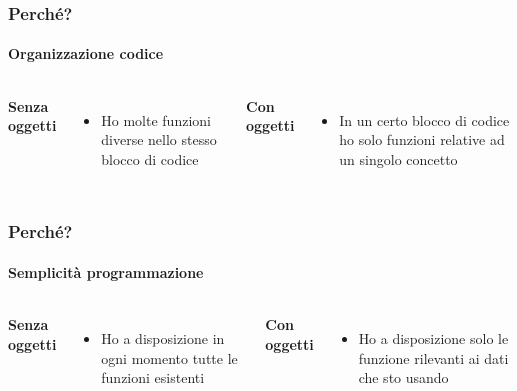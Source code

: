 \begin{contentframe}
    \frametitle{Perché?}
    \framesubtitle{Organizzazione codice}

    \begin{columns}
        \textbf{Senza oggetti}
        \begin{itemize}
            \item Ho molte funzioni diverse nello stesso blocco di codice
        \end{itemize}
        
        \textbf{Con oggetti}
        \begin{itemize}
            \item In un certo blocco di codice ho solo funzioni relative ad un singolo concetto
        \end{itemize}
    \end{columns}
\end{contentframe}

\begin{contentframe}
    \frametitle{Perché?}
    \framesubtitle{Semplicità programmazione}

    \begin{columns}
        \textbf{Senza oggetti}
        \begin{itemize}
            \item Ho a disposizione in ogni momento tutte le funzioni esistenti
        \end{itemize}
        
        \textbf{Con oggetti}
        \begin{itemize}
            \item Ho a disposizione solo le funzione rilevanti ai dati che sto usando
        \end{itemize}
    \end{columns}
\end{contentframe}


